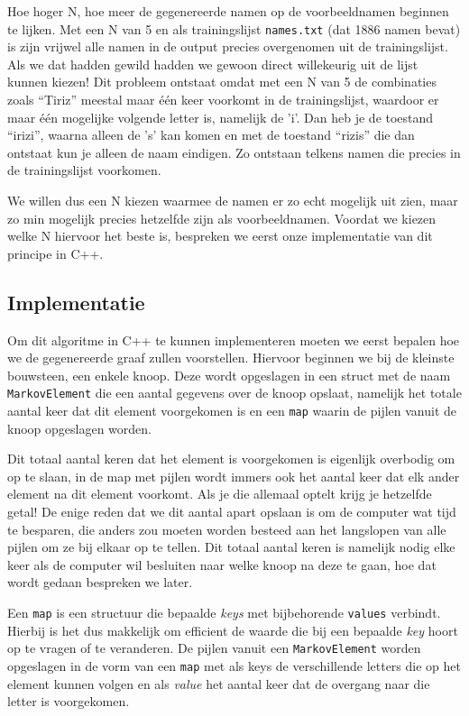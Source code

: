 \documentclass{article}
\begin{document}
Hoe hoger N, hoe meer de gegenereerde namen op de voorbeeldnamen beginnen te lijken. Met een N van 5 en als trainingslijst \texttt{names.txt} (dat 1886 namen bevat) is zijn vrijwel alle namen in de output precies overgenomen uit de trainingslijst. Als we dat hadden gewild hadden we gewoon direct willekeurig uit de lijst kunnen kiezen! Dit probleem ontstaat omdat met een N van 5 de combinaties zoals “Tiriz” meestal maar één keer voorkomt in de trainingslijst, waardoor er maar één mogelijke volgende letter is, namelijk de 'i'. Dan heb je de toestand “irizi”, waarna alleen de 's' kan komen en met de toestand “rizis” die dan ontstaat kun je alleen de naam eindigen. Zo ontstaan telkens namen die precies in de trainingslijst voorkomen.

We willen dus een N kiezen waarmee de namen er zo echt mogelijk uit zien, maar zo min mogelijk precies hetzelfde zijn als voorbeeldnamen. Voordat we kiezen welke N hiervoor het beste is, bespreken we eerst onze implementatie van dit principe in C++.

\subsection{Implementatie}

Om dit algoritme in C++ te kunnen implementeren moeten we eerst bepalen hoe we de gegenereerde graaf zullen voorstellen. Hiervoor beginnen we bij de kleinste bouwsteen, een enkele knoop. Deze wordt opgeslagen in een struct met de naam \texttt{MarkovElement} die een aantal gegevens over de knoop opslaat, namelijk het totale aantal keer dat dit element voorgekomen is en een \texttt{map} waarin de pijlen vanuit de knoop opgeslagen worden.

Dit totaal aantal keren dat het element is voorgekomen is eigenlijk overbodig om op te slaan, in de map met pijlen wordt immers ook het aantal keer dat elk ander element na dit element voorkomt. Als je die allemaal optelt krijg je hetzelfde getal! De enige reden dat we dit aantal apart opslaan is om de computer wat tijd te besparen, die anders zou moeten worden besteed aan het langslopen van alle pijlen om ze bij elkaar op te tellen. Dit totaal aantal keren is namelijk nodig elke keer als de computer wil besluiten naar welke knoop na deze te gaan, hoe dat wordt gedaan bespreken we later.

Een \texttt{map} is een structuur die bepaalde \emph{keys} met bijbehorende \texttt{values} verbindt. Hierbij is het dus makkelijk om efficient de waarde die bij een bepaalde \emph{key} hoort op te vragen of te veranderen. De pijlen vanuit een \texttt{MarkovElement} worden opgeslagen in de vorm van een \texttt{map} met als keys de verschillende letters die op het element kunnen volgen en als \emph{value} het aantal keer dat de overgang naar die letter is voorgekomen.
\end{document}
